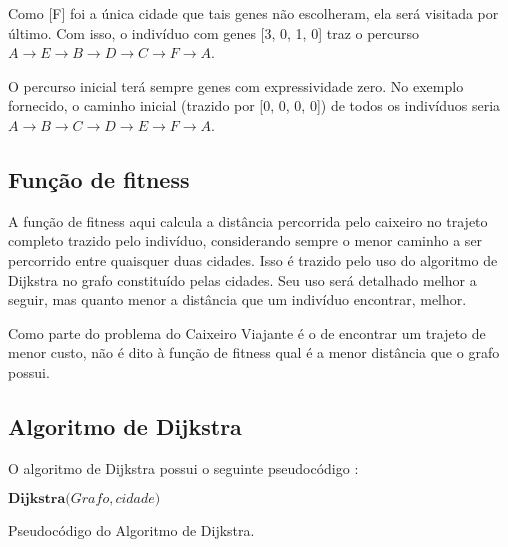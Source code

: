 Como [F] foi a única cidade que tais genes não escolheram, ela será visitada por último. Com isso, o indivíduo com genes [3, 0, 1, 0] traz o percurso $A \rightarrow E \rightarrow B \rightarrow D \rightarrow C \rightarrow F \rightarrow A$.

O percurso inicial terá sempre genes com expressividade zero. No exemplo fornecido, o caminho inicial (trazido por [0, 0, 0, 0]) de todos os indivíduos seria $A \rightarrow B \rightarrow C \rightarrow D \rightarrow E \rightarrow F \rightarrow A$.

\subsection*{Função de fitness}

A função de fitness aqui calcula a distância percorrida pelo caixeiro no trajeto completo trazido pelo indivíduo, considerando sempre o menor caminho a ser percorrido entre quaisquer duas cidades. Isso é trazido pelo uso do algoritmo de Dijkstra \cite{dijkstra1959note} no grafo constituído pelas cidades. Seu uso será detalhado melhor a seguir, mas quanto menor a distância que um indivíduo encontrar, melhor.

Como parte do problema do Caixeiro Viajante é o de encontrar um trajeto de menor custo, não é dito à função de fitness qual é a menor distância que o grafo possui.

\subsection*{Algoritmo de Dijkstra}

O algoritmo de Dijkstra possui o seguinte pseudocódigo \cite{cormen2001dijkstra}:

\begin{algorithm}[H]
$\textbf{Dijkstra(} Grafo, cidade \textbf{)}$
\caption{Pseudocódigo do Algoritmo de Dijkstra.}
\label{alg:dijkstra}
\end{algorithm}

